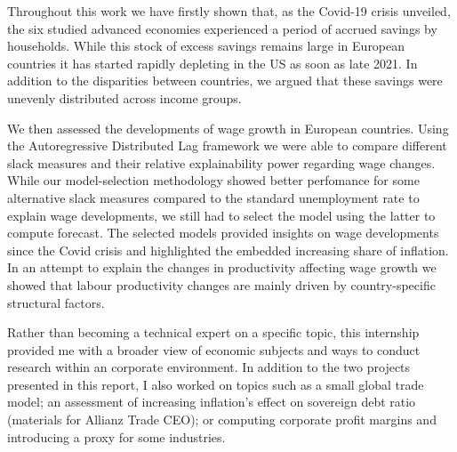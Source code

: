 \quad Throughout this work we have firstly shown that, as the Covid-19 crisis unveiled, the six studied advanced economies experienced a period of accrued savings by households. 
While this stock of excess savings remains large in European countries it has started rapidly depleting in the US as soon as late 2021. 
In addition to the disparities between countries, we argued that these savings were unevenly distributed across income groups.

We then assessed the developments of wage growth in European countries. 
Using the Autoregressive Distributed Lag framework we were able to compare different slack measures and their relative explainability power regarding wage changes.
While our model-selection methodology showed better perfomance for some alternative slack measures compared to the standard unemployment rate to explain wage developments, we still had to select the model using the latter to compute forecast. 
The selected models provided insights on wage developments since the Covid crisis and highlighted the embedded increasing share of inflation. In an attempt to explain the changes in productivity affecting wage growth we showed that labour productivity changes are mainly driven by country-specific structural factors.

Rather than becoming a technical expert on a specific topic, this internship provided me with a broader view of economic subjects and ways to conduct research within an corporate environment. 
In addition to the two projects presented in this report, I also worked on topics such as a small global trade model\cite{az_trade}; an assessment of increasing inflation’s effect on sovereign debt ratio (materials for Allianz Trade CEO\cite{az_debt}); or computing corporate profit margins and introducing a proxy for some industries\cite{az_margins}.